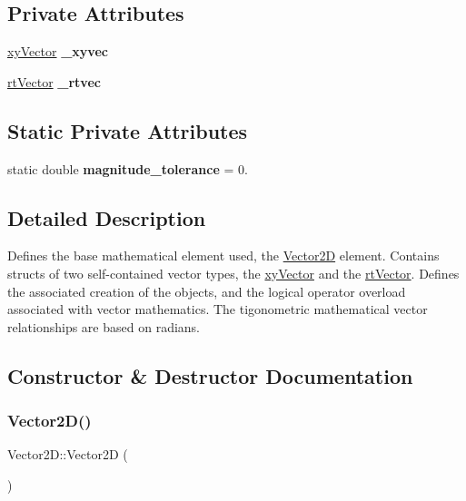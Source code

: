\subsection*{Private Attributes}
\begin{DoxyCompactItemize}
\item 
\mbox{\label{class_vector2_d_a151b8b70d16a3bf4544af58c2a721242}} 
\hyperlink{structxy_vector}{xy\+Vector} {\bfseries \+\_\+xyvec}
\item 
\mbox{\label{class_vector2_d_a97b229bece3801330df9ef710d0296e9}} 
\hyperlink{structrt_vector}{rt\+Vector} {\bfseries \+\_\+rtvec}
\end{DoxyCompactItemize}
\subsection*{Static Private Attributes}
\begin{DoxyCompactItemize}
\item 
\mbox{\label{class_vector2_d_a50a94297b6c05c07ee29900a438492a9}} 
static double {\bfseries magnitude\+\_\+tolerance} = 0.
\end{DoxyCompactItemize}


\subsection{Detailed Description}
Defines the base mathematical element used, the \hyperlink{class_vector2_d}{Vector2D} element. Contains structs of two self-\/contained vector types, the \hyperlink{structxy_vector}{xy\+Vector} and the \hyperlink{structrt_vector}{rt\+Vector}. Defines the associated creation of the objects, and the logical operator overload associated with vector mathematics. The tigonometric mathematical vector relationships are based on radians. 

\subsection{Constructor \& Destructor Documentation}
\mbox{\label{class_vector2_d_a98e9997ebb7a629f4db52397d4e0d653}} 
\subsubsection{\texorpdfstring{Vector2\+D()}{Vector2D()}\hspace{0.1cm}{\footnotesize\ttfamily [1/5]}}
{\footnotesize\ttfamily Vector2\+D\+::\+Vector2D (\begin{DoxyParamCaption}{ }\end{DoxyParamCaption})}



